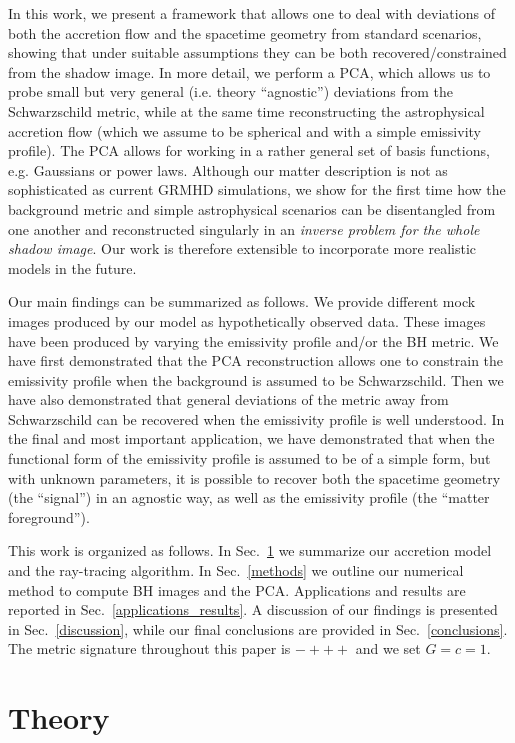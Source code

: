 \documentclass[%
nofootinbib,
 amsmath,amssymb,
 aps,
floatfix,
twocolumn
]{revtex4-2}
\begin{document}
In this work, we present a framework 
that allows one to deal with deviations of both
the accretion flow and the spacetime geometry from
standard scenarios, showing 
that under suitable assumptions they can 
be both recovered/constrained from the shadow image.
In more detail, 
 we perform a PCA, which allows us to probe small but very general (i.e. theory ``agnostic'') deviations from the Schwarzschild metric,
 while at the same time reconstructing the astrophysical accretion flow (which 
 we assume to be spherical and with  a simple emissivity profile). The PCA allows for working in a rather general set of basis functions, e.g. Gaussians or power laws. Although our matter description is not as sophisticated as current GRMHD simulations, we show for the first time how the background metric and simple astrophysical scenarios can be disentangled from one another 
 and reconstructed singularly in an \textit{inverse problem for the whole shadow image}. Our work is therefore extensible  to incorporate more realistic models in the future.

Our main findings can be summarized as follows. We provide different mock images produced by our model as hypothetically observed data. These images have been produced by varying the emissivity profile and/or the BH metric. We  have first  demonstrated that the PCA reconstruction allows one to constrain the emissivity profile when the background is assumed to be Schwarzschild. Then we have also demonstrated that general deviations of the metric away from Schwarzschild can be recovered when the emissivity profile is well understood. In the final and most important application, we have demonstrated that when the functional form of the emissivity profile is assumed to be of a simple form, but with unknown parameters, it is possible to recover both the spacetime geometry (the ``signal'') in an agnostic way, as well as the emissivity profile (the ``matter foreground'').

This work is organized as follows. In Sec.~\ref{theory} we summarize  our accretion model and the ray-tracing algorithm. In Sec.~\ref{methods} we outline our numerical method to compute BH images and the PCA. Applications and results are reported in Sec.~\ref{applications_results}. A discussion of our findings is presented in Sec.~\ref{discussion}, while our final conclusions are provided in Sec.~\ref{conclusions}. The metric signature throughout this paper is \(-+++\) and we set \(G = c = 1\).

\section{Theory}\label{theory}
\end{document}
